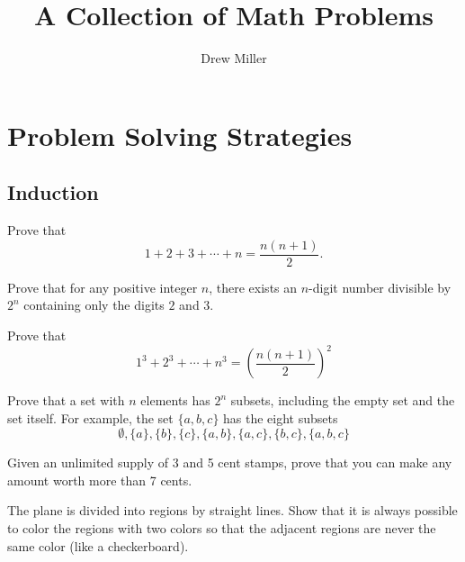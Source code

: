 \documentclass[12pt]{article}
\title{A Collection of Math Problems}
\author{Drew Miller}
\date{}
\begin{document}
\maketitle
\tableofcontents

\section{Problem Solving Strategies}

    \subsection{Induction}

        \begin{exercise}
            Prove that
            \[1+2+3+\cdots+n = \frac{n(n+1)}{2}.\]
        \end{exercise}

        \begin{exercise}
            Prove that for any positive integer \(n\), there exists an \(n\)-digit number divisible by \(2^n\) containing only the digits \(2\) and \(3\).
        \end{exercise}

        \begin{exercise}
            Prove that
            \[1^3 + 2^3 +\cdots+n^3 = \left(\frac{n(n+1)}{2}\right)^2\]
        \end{exercise}
        
        \begin{exercise}
            Prove that a set with $n$ elements has $2^n$ subsets, including the empty set and the set itself. For example, the set $\{a,b,c\}$ has the eight subsets
            \[\emptyset,\{a\},\{b\},\{c\},\{a,b\},\{a,c\},\{b,c\},\{a,b,c\}\]
        \end{exercise}
        
        \begin{exercise}
            Given an unlimited supply of 3 and 5 cent stamps, prove that you can make any amount worth more than 7 cents.
        \end{exercise}
        
        \begin{exercise}
            The plane is divided into regions by straight lines. Show that it is always possible to color the regions with two colors so that the adjacent regions are never the same color (like a checkerboard).
        \end{exercise}
        
\end{document}
